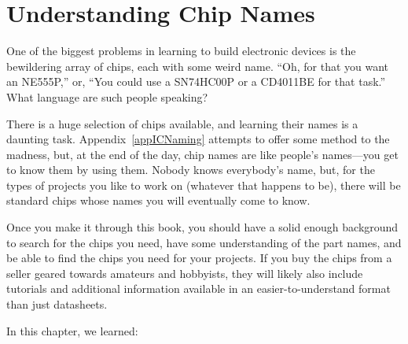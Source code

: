 
\section{Understanding Chip Names}

One of the biggest problems in learning to build electronic devices is the bewildering array of chips, each with some weird name.
``Oh, for that you want an NE555P,'' or, ``You could use a SN74HC00P or a CD4011BE for that task.''
What language are such people speaking?

There is a huge selection of chips available, and learning their names is a daunting task.
Appendix~\ref{appICNaming} attempts to offer some method to the madness, but, at the end of the day, chip names are like people's names---you get to know them by using them.
Nobody knows everybody's name, but, for the types of projects you like to work on (whatever that happens to be), there will be standard chips whose names you will eventually come to know.

Once you make it through this book, you should have a solid enough background to search for the chips you need, have some understanding of the part names, and be able to find the chips you need for your projects.
If you buy the chips from a seller geared towards amateurs and hobbyists, they will likely also include tutorials and additional information available in an easier-to-understand format than just datasheets.


\reviewsection

In this chapter, we learned:

